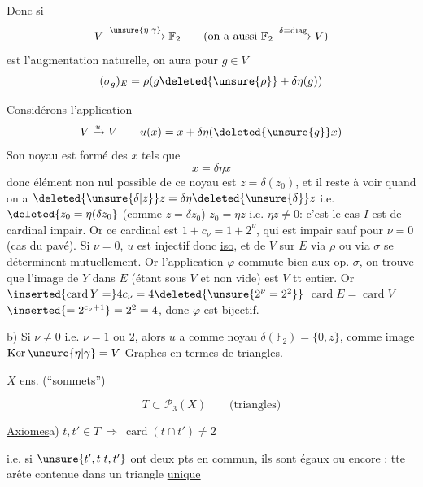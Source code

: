 Donc si
\[
V\xrightarrow{\unsure{\eta|\gamma}}\mathbb F_2\qquad
(\text{on a aussi }\mathbb F_2\xrightarrow{\delta=\mathrm{diag}}V)
\]
est l'augmentation naturelle, on aura pour $g\in V$
\[
(\sigma_g)_E=\rho(g\deleted{\unsure{\rho}}+\delta\eta(g))
\]

Considérons l'application
\[
V\xrightarrow{u}V\qquad u(x)=x+\delta\eta(\deleted{\unsure{g}}x)
\]
Son noyau est formé des $x$ tels que
\[
x=\delta\eta x
\]
donc  élément non nul possible de ce noyau est $z=\delta(z_0)$, et il reste à voir quand on a $\deleted{\unsure{\delta|z}}z=\delta\eta\deleted{\unsure{\delta}}z$ i.e. $\deleted{z_0=\eta(\delta z_0}$ (comme $z=\delta z_0$) $z_0=\eta z$ i.e. $\eta z\ne0$: c'est le cas  $I$ est de cardinal impair. Or ce cardinal est $1+c_\nu=1+2^\nu$, qui est impair sauf pour $\nu=0$ (cas du pavé).    Si $\nu=0$, $u$ est injectif donc \uline{iso}, et  de $V$ sur $E$ via $\rho$ ou via $\sigma$ se déterminent mutuellement. Or l'application $\varphi$ commute bien
aux op. $\sigma$, on trouve que l'image de $Y$ dans $E$  (étant  sous $V$ et non vide) est $V$ tt entier. Or $\inserted{\operatorname{card}Y=}4c_\nu=4\deleted{\unsure{2^\nu=2^2}}$ \deleted{\unsure{=}} $\operatorname{card}E=\operatorname{card}V$  $\inserted{=2^{c_\nu+1}}=2^2=4$, donc  $\varphi$ est bijectif.

b) Si $\nu\ne0$ i.e. $\nu=1$ ou $2$, alors  $u$ a comme noyau  $\delta(\mathbb F_2)=\{0,z\}$, comme image $\operatorname{Ker}\unsure{\eta|\gamma}=V$ 
Graphes  en termes de triangles.

$X$ ens. (``sommets'')

\[T\subset\mathcal P_3(X)\qquad\text{(triangles)}\]

\uline{Axiomes}\quad a) $\underline t,\underline t'\in T\ \Longrightarrow\ \operatorname{card}(\underline t\cap\underline t')\ne2$

i.e. si $\unsure{t',t|t,t'}$ ont deux pts en commun, ils sont égaux ou encore : tte arête contenue dans un triangle \uline{unique}


